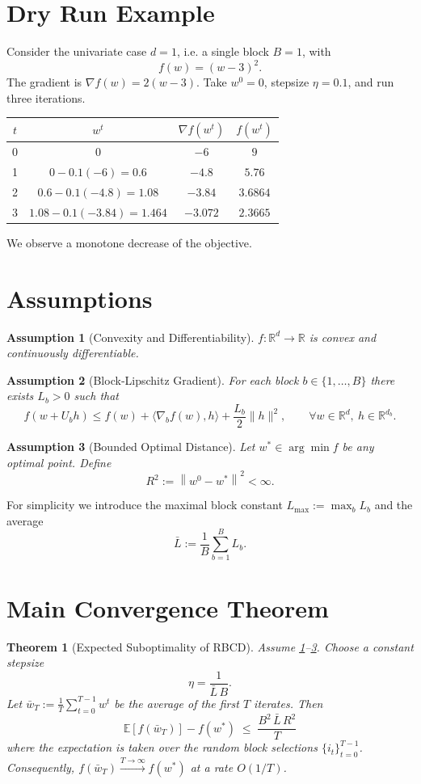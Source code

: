 \documentclass{article}
\newtheorem{theorem}{Theorem}
\newtheorem{assumption}{Assumption}
\newcommand{\E}{\mathbb{E}}
\newcommand{\norm}[1]{\left\lVert#1\right\rVert}
\begin{document}
\section*{Dry Run Example}
Consider the univariate case $d=1$, i.e. a single block $B=1$, with
\[
f(w)=(w-3)^{2}.
\]
The gradient is $\nabla f(w)=2(w-3)$.  
Take $w^{0}=0$, stepsize $\eta=0.1$, and run three iterations.

\begin{center}
\begin{tabular}{c|c|c|c}
$t$ & $w^{t}$ & $\nabla f(w^{t})$ & $f(w^{t})$\\ \hline
0 & $0$ & $-6$ & $9$\\
1 & $0-0.1(-6)=0.6$ & $-4.8$ & $5.76$\\
2 & $0.6-0.1(-4.8)=1.08$ & $-3.84$ & $3.6864$\\
3 & $1.08-0.1(-3.84)=1.464$ & $-3.072$ & $2.3665$\\
\end{tabular}
\end{center}
We observe a monotone decrease of the objective.

\newpage
\section*{Assumptions}
\begin{assumption}[Convexity and Differentiability]\label{as:convex}
$f:\mathbb{R}^{d}\rightarrow\mathbb{R}$ is convex and continuously differentiable.
\end{assumption}
\begin{assumption}[Block‑Lipschitz Gradient]\label{as:lipschitz}
For each block $b\in\{1,\dots ,B\}$ there exists $L_{b}>0$ such that
\[
f(w+U_{b}h)\le f(w)+\langle\nabla_{b}f(w),h\rangle+\frac{L_{b}}{2}\|h\|^{2},
\qquad\forall w\in\mathbb{R}^{d},~h\in\mathbb{R}^{d_{b}} .
\tag{2}
\]
\end{assumption}
\begin{assumption}[Bounded Optimal Distance]\label{as:bounded}
Let $w^{*}\in\arg\min f$ be any optimal point. Define
\[
R^{2}:=\norm{w^{0}-w^{*}}^{2}<\infty .
\]
\end{assumption}
For simplicity we introduce the maximal block constant $L_{\max}:=\max_{b}L_{b}$ and the average
\[
\bar L:=\frac{1}{B}\sum_{b=1}^{B}L_{b}.
\]

\section*{Main Convergence Theorem}
\begin{theorem}[Expected Suboptimality of RBCD]\label{thm:main}
Assume \ref{as:convex}–\ref{as:bounded}. Choose a constant stepsize
\[
\eta=\frac{1}{\bar L\,B}.
\tag{3}
\]
Let $\bar w_{T}:=\frac{1}{T}\sum_{t=0}^{T-1}w^{t}$ be the average of the first $T$ iterates.
Then
\[
\boxed{
\E\!\left[f(\bar w_{T})\right]-f(w^{*})
\;\le\;
\frac{B^{2}\,\bar L\,R^{2}}{T}
}
\tag{4}
\]
where the expectation is taken over the random block selections $\{i_{t}\}_{t=0}^{T-1}$.
Consequently, $f(\bar w_{T})\xrightarrow{T\to\infty}f(w^{*})$ at a rate $O(1/T)$.
\end{theorem}
\end{document}
